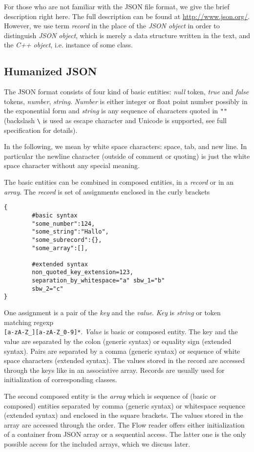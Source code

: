 For those who are not familiar with the JSON file format, we give the brief description right here. The full description can be found at
\url{http://www.json.org/}. However, we use term {\it record} in the place of the {\it JSON object} in order to distinguish {\it JSON object}, 
which is merely a data structure written in the text, and the {\it C++ object}, i.e. instance of some class. 

\subsection{Humanized JSON}
The JSON format consists of four kind of basic entities: 
{\it null} token, {\it true} and {\it false} tokens, {\it number}, {\it string}. {\it Number} is either integer or float point number 
possibly in the exponential form and {\it string} is any sequence of characters quoted in \verb'""' (backslash \verb"\" is used as escape character and 
Unicode is supported, see full specification for details). 

In the following, we mean by white space characters:
space, tab, and new line. In particular the newline character (outside of comment or quoting) is just the white space character without any special meaning.

The basic entities can be combined in composed entities, in a {\it record} or in an {\it array}. The {\it record} is set of assignments enclosed in the curly brackets
\begin{verbatim}
{
        #basic syntax
        "some_number":124, 
        "some_string":"Hallo",
        "some_subrecord":{},
        "some_array":[],
        
        #extended syntax
        non_quoted_key_extension=123,
        separation_by_whitespace="a" sbw_1="b"
        sbw_2="c"
}
\end{verbatim}
One assignment is a pair of the {\it key} and the {\it value}. {\it Key} is {\it string} or token matching regexp\\
\verb'[a-zA-Z_][a-zA-Z_0-9]*'.
{\it Value} is basic or composed entity.
The key and the value are separated by the colon (generic syntax) or equality sign (extended syntax). Pairs are separated by a comma (generic syntax) or 
sequence of white space characters (extended syntax). The values stored in the record are accessed through the keys like in an associative array. Records are usually used for initialization of corresponding classes.

The second composed entity is the {\it array} which is sequence of (basic or composed) entities separated by comma (generic syntax) or whitespace sequence 
(extended syntax) and enclosed in the square brackets. 
The values stored in the array are accessed through the order. The Flow reader offers either initialization of a container from JSON array or
a sequential access. The latter one is the only possible access for the included arrays, which we discuss later.

